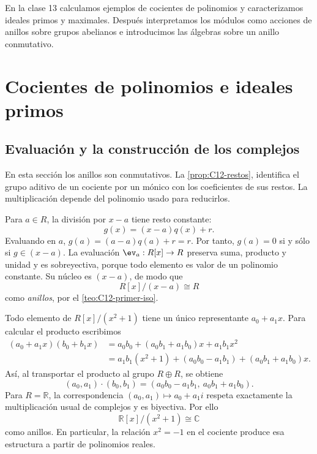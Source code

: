 En la clase 13 calculamos ejemplos de cocientes de polinomios y caracterizamos ideales primos y maximales. Después interpretamos los módulos como acciones de anillos sobre grupos abelianos e introducimos las álgebras sobre un anillo conmutativo.

\section{Cocientes de polinomios e ideales primos}
\subsection{Evaluación y la construcción de los complejos}
En esta sección los anillos son conmutativos. La \cref{prop:C12-restos}, identifica el grupo aditivo de un cociente por un mónico con los coeficientes de sus restos. La multiplicación depende del polinomio usado para reducirlos.

\begin{ejem}\label{ejem:C13-evaluacion}
Para $a\in R$, la división por $x-a$ tiene resto constante:
\[
g(x)=(x-a)q(x)+r.
\]
Evaluando en $a$, $g(a)=(a-a)q(a)+r=r$. Por tanto, $g(a)=0$ si y sólo si $g\in(x-a)$. La evaluación $\ev_a:R[x]\to R$ preserva suma, producto y unidad y es sobreyectiva, porque todo elemento es valor de un polinomio constante. Su núcleo es $(x-a)$, de modo que
\[
R[x]/(x-a)\cong R
\]
como \emph{anillos}, por el \cref{teo:C12-primer-iso}.
\end{ejem}

\begin{ejem}
Todo elemento de $R[x]/(x^2+1)$ tiene un único representante $a_0+a_1x$. Para calcular el producto escribimos
\[
\begin{aligned}
(a_0+a_1x)(b_0+b_1x)
&=a_0b_0+(a_0b_1+a_1b_0)x+a_1b_1x^2\\
&=a_1b_1(x^2+1)+(a_0b_0-a_1b_1)+(a_0b_1+a_1b_0)x.
\end{aligned}
\]
Así, al transportar el producto al grupo $R\oplus R$, se obtiene
\[
(a_0,a_1)\cdot(b_0,b_1)
=(a_0b_0-a_1b_1,\ a_0b_1+a_1b_0).
\]
Para $R=\mathbb R$, la correspondencia $(a_0,a_1)\mapsto a_0+a_1i$ respeta exactamente la multiplicación usual de complejos y es biyectiva. Por ello
\[
\mathbb R[x]/(x^2+1)\cong\mathbb C
\]
como anillos. En particular, la relación $x^2=-1$ en el cociente produce esa estructura a partir de polinomios reales.
\end{ejem}

